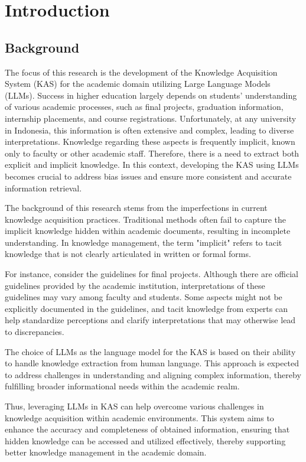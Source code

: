 \documentclass[runningheads]{llncs}
\begin{document}
\section{Introduction}
\subsection{Background}

The focus of this research is the development of the Knowledge Acquisition System (KAS) for the academic domain utilizing Large Language Models (LLMs). Success in higher education largely depends on students' understanding of various academic processes, such as final projects, graduation information, internship placements, and course registrations. Unfortunately, at any university in Indonesia, this information is often extensive and complex, leading to diverse interpretations. Knowledge regarding these aspects is frequently implicit, known only to faculty or other academic staff. Therefore, there is a need to extract both explicit and implicit knowledge. In this context, developing the KAS using LLMs becomes crucial to address bias issues and ensure more consistent and accurate information retrieval.

The background of this research stems from the imperfections in current knowledge acquisition practices. Traditional methods often fail to capture the implicit knowledge hidden within academic documents, resulting in incomplete understanding. In knowledge management, the term "implicit" refers to tacit knowledge that is not clearly articulated in written or formal forms.

For instance, consider the guidelines for final projects. Although there are official guidelines provided by the academic institution, interpretations of these guidelines may vary among faculty and students. Some aspects might not be explicitly documented in the guidelines, and tacit knowledge from experts can help standardize perceptions and clarify interpretations that may otherwise lead to discrepancies.

The choice of LLMs as the language model for the KAS is based on their ability to handle knowledge extraction from human language. This approach is expected to address challenges in understanding and aligning complex information, thereby fulfilling broader informational needs within the academic realm.

Thus, leveraging LLMs in KAS can help overcome various challenges in knowledge acquisition within academic environments. This system aims to enhance the accuracy and completeness of obtained information, ensuring that hidden knowledge can be accessed and utilized effectively, thereby supporting better knowledge management in the academic domain.
\end{document}

